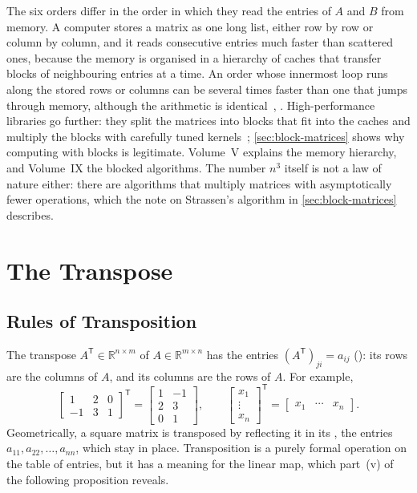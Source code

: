 The six orders differ in the order in which they read the entries of $A$ and $B$ from memory. A computer stores a matrix as one long list, either row by row or column by column, and it reads consecutive entries much faster than scattered ones, because the memory is organised in a hierarchy of caches that transfer blocks of neighbouring entries at a time. An order whose innermost loop runs along the stored rows or columns can be several times faster than one that jumps through memory, although the arithmetic is identical~\cite{dongarra1984}, \cite[Sect.~1.1]{golub2013}. High-performance libraries go further: they split the matrices into blocks that fit into the caches and multiply the blocks with carefully tuned kernels~\cite{goto2008}; \cref{sec:block-matrices} shows why computing with blocks is legitimate. Volume~V explains the memory hierarchy, and Volume~IX the blocked algorithms. The number $n^3$ itself is not a law of nature either: there are algorithms that multiply matrices with asymptotically fewer operations, which the note on Strassen's algorithm in \cref{sec:block-matrices} describes.

\section{The Transpose}
\label{sec:transpose}

\subsection{Rules of Transposition}

The transpose $A^{\mathsf T}\in\mathbb R^{n\times m}$ of $A\in\mathbb R^{m\times n}$ has the entries $(A^{\mathsf T})_{ji}=a_{ij}$ (): its rows are the columns of $A$, and its columns are the rows of $A$. For example,
\[
\begin{bmatrix}1&2&0\\-1&3&1\end{bmatrix}^{\mathsf T}=\begin{bmatrix}1&-1\\2&3\\0&1\end{bmatrix},\qquad\begin{bmatrix}x_1\\\vdots\\x_n\end{bmatrix}^{\mathsf T}=\begin{bmatrix}x_1&\cdots&x_n\end{bmatrix}.
\]
Geometrically, a square matrix is transposed by reflecting it in its , the entries $a_{11},a_{22},\ldots,a_{nn}$, which stay in place. Transposition is a purely formal operation on the table of entries, but it has a meaning for the linear map, which part~(v) of the following proposition reveals.

